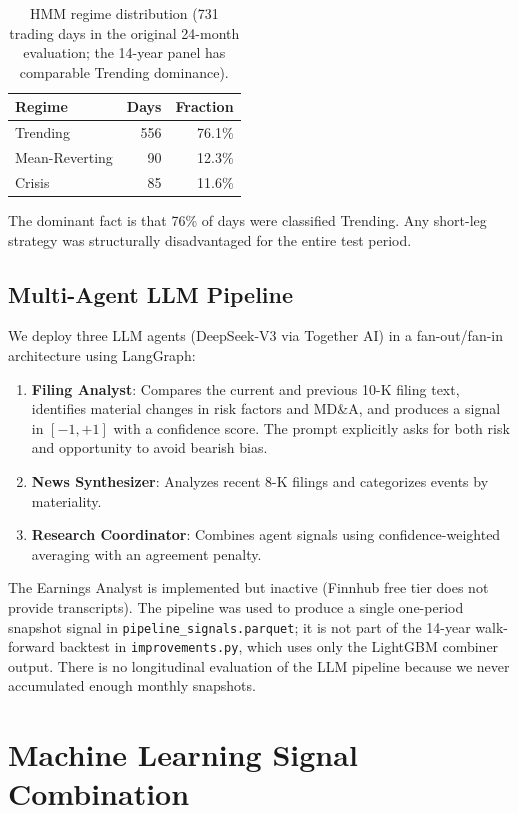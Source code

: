 \documentclass[11pt,a4paper]{article}
\begin{document}
\begin{table}[H]
\centering
\caption{HMM regime distribution (731 trading days in the original 24-month evaluation; the 14-year panel has comparable Trending dominance).}
\label{tab:regimes}
\begin{tabular}{lrr}
\toprule
Regime & Days & Fraction \\
\midrule
Trending & 556 & 76.1\% \\
Mean-Reverting & 90 & 12.3\% \\
Crisis & 85 & 11.6\% \\
\bottomrule
\end{tabular}
\end{table}

The dominant fact is that 76\% of days were classified Trending. Any short-leg strategy was structurally disadvantaged for the entire test period.

\subsection{Multi-Agent LLM Pipeline}

We deploy three LLM agents (DeepSeek-V3 via Together AI) in a fan-out/fan-in architecture using LangGraph:
\begin{enumerate}[noitemsep]
    \item \textbf{Filing Analyst}: Compares the current and previous 10-K filing text, identifies material changes in risk factors and MD\&A, and produces a signal in $[-1, +1]$ with a confidence score. The prompt explicitly asks for both risk and opportunity to avoid bearish bias.
    \item \textbf{News Synthesizer}: Analyzes recent 8-K filings and categorizes events by materiality.
    \item \textbf{Research Coordinator}: Combines agent signals using confidence-weighted averaging with an agreement penalty.
\end{enumerate}

The Earnings Analyst is implemented but inactive (Finnhub free tier does not provide transcripts). The pipeline was used to produce a single one-period snapshot signal in \texttt{pipeline\_signals.parquet}; it is not part of the 14-year walk-forward backtest in \texttt{improvements.py}, which uses only the LightGBM combiner output. There is no longitudinal evaluation of the LLM pipeline because we never accumulated enough monthly snapshots.

\section{Machine Learning Signal Combination}
\label{sec:ml}
\end{document}
